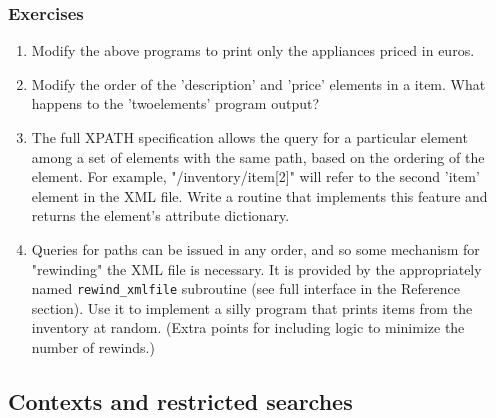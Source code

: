 \documentclass[11pt]{article}
\begin{document}
\subsubsection{Exercises}
\begin{enumerate}
\item Modify the above programs to print only the appliances priced in
euros.
\item Modify the order of the 'description' and 'price' elements in a
item. What happens to the 'twoelements' program output?
\item The full XPATH specification allows the query for a particular
element among a set of elements with the same path, based on the
ordering of the element. For example, "/inventory/item[2]" will refer
to the second 'item' element in the XML file. Write a routine that
implements this feature and returns the element's attribute
dictionary.
\item Queries for paths can be issued in any order, and so some
mechanism for "rewinding" the XML file is necessary. It is provided by
the appropriately named \texttt{rewind\_xmlfile} subroutine (see full
interface in the Reference section). Use it to implement a silly
program that prints items from the inventory at random. (Extra points
for including logic to minimize the number of rewinds.)
\end{enumerate}
%

\subsection{Contexts and restricted searches}
\end{document}
